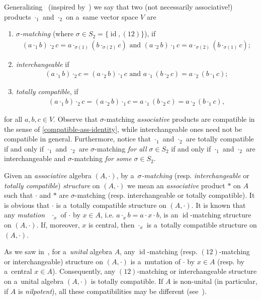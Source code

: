 \documentclass{jonasart}
\newcommand{\sg}{\sigma}
\DeclareMathOperator{\id}{id}
\begin{document}
	Generalizing~\cite[Definition 1.1]{Khr2024} (inspired by~\cite{zgg23}) we say that two (not necessarily associative!) products $\cdot_1$ and $\cdot_2$ on a~same vector space $V$ are
	\begin{enumerate}
		\item \textit{$\sg$-matching} (where $\sg\in S_2 =\{\id,(12)\}$), if
		\begin{align}
			(a\cdot_1 b)\cdot_2 c = a\cdot_{\sg(1)}(b\cdot_{\sg(2)}c) \text{ and } (a\cdot_2 b)\cdot_1
			c = a\cdot_{\sg(2)}(b\cdot_{\sg(1)}c);
		\end{align}
		\item \textit{interchangeable} if
		\begin{align*}
			(a\cdot_1 b)\cdot_2 c = (a\cdot_2 b)\cdot_1 c \text{ and } a\cdot_1 (b\cdot_2 c) = a\cdot_2 (b\cdot_1 c);
		\end{align*}
		\item \textit{totally compatible}, if
		\begin{align}
			(a\cdot_1 b)\cdot_2 c = (a\cdot_2 b)\cdot_1 c = a\cdot_1 (b\cdot_2 c) = a\cdot_2 (b\cdot_1 c),
		\end{align}
	\end{enumerate}
	for all $a,b,c\in V$. Observe that $\sg$-matching \textit{associative} products are compatible in the sense of \eqref{compatible-ass-identity}, while interchangeable ones need not be compatible in general. Furthermore, notice that $\cdot_1$ and $\cdot_2$ are totally compatible if and only if $\cdot_1$ and $\cdot_2$ are $\sg$-matching \textit{for all} $\sg\in S_2$ if and only if $\cdot_1$ and $\cdot_2$ are interchangeable and $\sg$-matching \textit{for some} $\sg\in S_2$.

	Given an \textit{associative} algebra $(A,\cdot)$, by a~\textit{$\sg$-matching} (resp. \textit{interchangeable} or \textit{totally compatible}) \textit{structure} on $(A,\cdot)$ we mean an \textit{associative} product $*$ on $A$ such that $\cdot$ and $*$ are $\sg$-matching (resp. interchangeable or totally compatible). It is obvious that $\cdot$ is a~totally compatible structure on $(A,\cdot)$. It is known that any \textit{mutation}~\cite{ElduqueMyung} $\cdot_x$ of $\cdot$ by $x\in A$, i.e. $a\cdot_x b=a\cdot x\cdot b$, is an $\id$-matching structure on $(A,\cdot)$. If, moreover, $x$ is central, then $\cdot_x$ is a~totally compatible structure on $(A,\cdot)$.

	As we saw in~\cite[Propositions 2.2 and 2.6]{Khr2024}, for a~\textit{unital} algebra $A$, any $\id$-matching (resp. $(12)$-matching or interchangeable) structure on $(A,\cdot)$ is a~mutation of $\cdot$ by $x\in A$ (resp. by a~central $x\in A$). Consequently, any $(12)$-matching or interchangeable structure on a~unital algebra $(A,\cdot)$ is totally compatible. If $A$ is non-unital (in particular, if $A$ is \textit{nilpotent}), all these compatibilities may be different (see~\cite[Examples 1.4 and 1.5]{Khr2024}).
\end{document}
